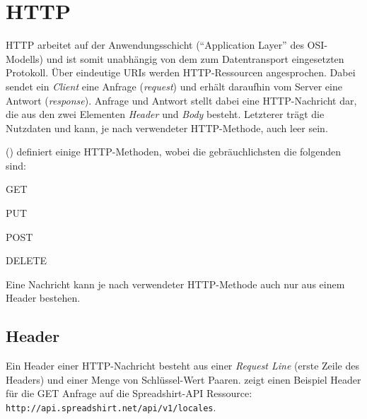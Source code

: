 \section{HTTP}
\label{sec:http}


HTTP arbeitet auf der Anwendungsschicht (\enquote{Application Layer} des OSI-Modells) und ist somit unabhängig von dem zum Datentransport eingesetzten Protokoll. 
Über eindeutige \glspl{URI} werden HTTP-Ressourcen angesprochen. Dabei sendet ein \emph{Client} eine Anfrage (\emph{request}) und erhält daraufhin vom Server eine Antwort (\emph{response}). Anfrage und Antwort stellt dabei eine HTTP-Nachricht dar, die aus den zwei Elementen \emph{Header} und \emph{Body} besteht. Letzterer trägt die Nutzdaten und kann, je nach verwendeter HTTP-Methode, auch leer sein.

 (\cite{rfc2616}) definiert einige HTTP-Methoden, wobei die gebräuchlichsten die folgenden sind:
\begin{compactitem}
    \item GET
    \item PUT
    \item POST
    \item DELETE
\end{compactitem}

Eine Nachricht kann je nach verwendeter HTTP-Methode auch nur aus einem Header bestehen.

\subsection{Header}
\label{sec:http-header}

Ein Header einer HTTP-Nachricht besteht aus einer \emph{Request Line} (erste Zeile des Headers) und einer Menge von Schlüssel-Wert Paaren.  zeigt einen Beispiel Header für die GET Anfrage auf die Spreadshirt-API Ressource:
\texttt{http://api.spreadshirt.net/api/v1/locales}.

